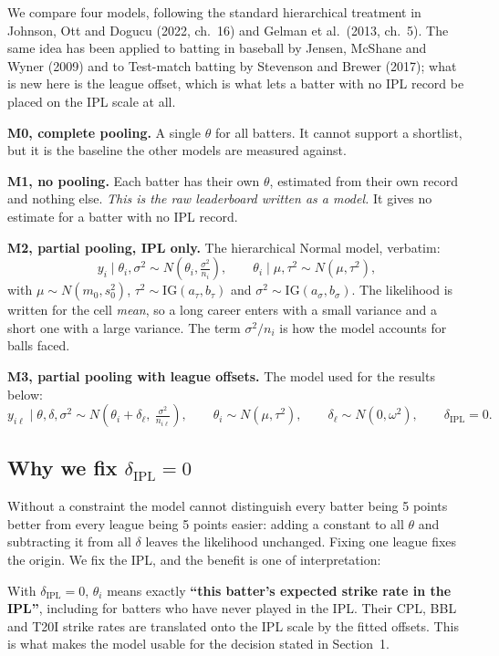 \documentclass[11pt,a4paper]{article}
\begin{document}
We compare four models, following the standard hierarchical treatment in Johnson, Ott and
Dogucu (2022, ch.\ 16) and Gelman et al.\ (2013, ch.\ 5). The same idea has been applied
to batting in baseball by Jensen, McShane and Wyner (2009) and to Test-match batting by
Stevenson and Brewer (2017); what is new here is the league offset, which is what lets a
batter with no IPL record be placed on the IPL scale at all.

\textbf{M0, complete pooling.} A single $\theta$ for all batters. It cannot support a
shortlist, but it is the baseline the other models are measured against.

\textbf{M1, no pooling.} Each batter has their own $\theta$, estimated from their own record
and nothing else. \emph{This is the raw leaderboard written as a model.} It gives no estimate
for a batter with no IPL record.

\textbf{M2, partial pooling, IPL only.} The hierarchical Normal model, verbatim:
\[
y_i \mid \theta_i, \sigma^2 \sim N\!\left(\theta_i, \tfrac{\sigma^2}{n_i}\right), \qquad
\theta_i \mid \mu, \tau^2 \sim N(\mu, \tau^2),
\]
with $\mu \sim N(m_0, s_0^2)$, $\tau^2 \sim \mathrm{IG}(a_\tau,b_\tau)$ and
$\sigma^2 \sim \mathrm{IG}(a_\sigma,b_\sigma)$. The likelihood is written for the cell
\emph{mean}, so a long career enters with a small variance and a short one with a large
variance. The term $\sigma^2/n_i$ is how the model accounts for balls faced.

\textbf{M3, partial pooling with league offsets.} The model used for the results below:
\[
y_{i\ell} \mid \theta, \delta, \sigma^2 \sim
N\!\left(\theta_i + \delta_\ell,\ \tfrac{\sigma^2}{n_{i\ell}}\right), \qquad
\theta_i \sim N(\mu, \tau^2), \qquad
\delta_\ell \sim N(0, \omega^2), \qquad \delta_{\text{IPL}} = 0 .
\]

\subsection{Why we fix $\delta_{\text{IPL}} = 0$}

Without a constraint the model cannot distinguish every batter being 5 points better from
every league being 5 points easier: adding a constant to all $\theta$ and subtracting it from
all $\delta$ leaves the likelihood unchanged. Fixing one league fixes the origin. We fix the
IPL, and the benefit is one of interpretation:

\begin{callout}
With $\delta_{\text{IPL}}=0$, $\theta_i$ means exactly \textbf{``this batter's expected strike
rate in the IPL''}, including for batters who have never played in the IPL. Their CPL, BBL and
T20I strike rates are translated onto the IPL scale by the fitted offsets. This is what makes
the model usable for the decision stated in Section~1.
\end{callout}
\end{document}
